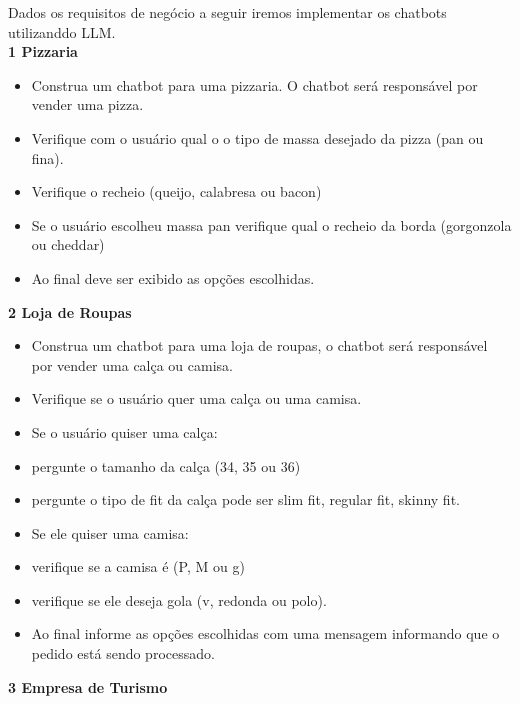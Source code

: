 \documentclass[14pt,a4paper,oneside]{book}
\begin{document}
Dados os requisitos de negócio a seguir iremos implementar os chatbots utilizanddo LLM. \\

\textbf{1 Pizzaria} \\

\begin{itemize}[nosep]
	\item Construa um chatbot para uma pizzaria. O chatbot será responsável por vender uma pizza.
	\item Verifique com o usuário qual o o tipo de massa desejado da pizza (pan ou fina).
	\item Verifique o recheio (queijo, calabresa ou bacon)
	\item Se o usuário escolheu massa pan verifique qual o recheio da borda (gorgonzola ou cheddar)
	\item Ao final deve ser exibido as opções escolhidas.
\end{itemize} 

\vspace{\baselineskip}

\textbf{2 Loja de Roupas} \\

\begin{itemize}[nosep]
	\item Construa um chatbot para uma loja de roupas, o chatbot será responsável por vender uma calça ou camisa.
	\item Verifique se o usuário quer uma calça ou uma camisa.
	\item Se o usuário quiser uma calça:
	\item pergunte o tamanho da calça (34, 35 ou 36)
	\item pergunte o tipo de fit da calça pode ser slim fit, regular fit, skinny fit.
	\item Se ele quiser uma camisa:
	\item verifique se a camisa é (P, M ou g)
	\item verifique se ele deseja gola (v, redonda ou polo).
	\item Ao final informe as opções escolhidas com uma mensagem informando que o pedido está sendo processado.
\end{itemize} 

\vspace{\baselineskip}

\textbf{3 Empresa de Turismo} \\
\end{document}
